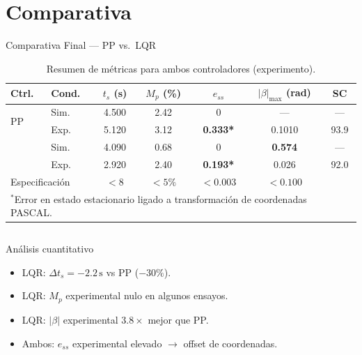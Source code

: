 \documentclass[mathserif,spanish,10pt]{beamer}
\newcommand{\good}[1]{\textcolor{passgreen}{#1}}
\newcommand{\warn}[1]{\textbf{\color{kpiorange}#1}}
\begin{document}
\section{Comparativa}

\begin{frame}{Comparativa Final --- PP vs.\ LQR}

\begin{table}
    \centering
    \caption{Resumen de métricas para ambos controladores (experimento).}
    \small
    \begin{tabular}{llccccc}
      \hline
      \rowcolor{rowhdr}
      \color{white}\textbf{Ctrl.} &
      \color{white}\textbf{Cond.} &
      \color{white}$t_s$ (s) &
      \color{white}$M_p$ (\%) &
      \color{white}$e_{ss}$ &
      \color{white}$|\beta|_{\max}$ (rad) &
      \color{white}SC \\
      \hline
      \multirow{2}{*}{PP} & Sim. & 4.500 & 2.42 & 0 & --- & --- \\
                          & Exp. & 5.120 & 3.12 & \warn{0.333*} & 0.1010 & 93.9 \\
      \hline
      \rowcolor{rowsim}
                          & Sim. & 4.090 & 0.68 & 0 & \warn{0.574} & --- \\
      \rowcolor{rowsim}
      \multirow{-2}{*}{LQR} & Exp. & \good{2.920} & \good{2.40} & \warn{0.193*} & \good{0.026} & \good{92.0} \\
      \hline
      \multicolumn{2}{l}{\scriptsize Especificación} &
      \scriptsize$<8$ & \scriptsize$<5\%$ &
      \scriptsize$<0.003$ &
      \scriptsize$<0.100$ & \\
      \hline
      \multicolumn{7}{l}{\scriptsize $^*$Error en estado estacionario ligado a transformación de coordenadas PASCAL.}
    \end{tabular}
  \end{table}

  \vspace{2pt}
  \begin{columns}[T]
    \begin{block}{\small Análisis cuantitativo}
      \scriptsize
      \begin{itemize}
        \item LQR: $\Delta t_s = -2.2\,\text{s}$ vs PP ($-30\%$).
        \item LQR: $M_p$ experimental nulo en algunos ensayos.
        \item LQR: $|\beta|$ experimental $3.8\times$ mejor que PP.
        \item Ambos: $e_{ss}$ experimental elevado $\to$ offset de coordenadas.
      \end{itemize}
    \end{block}


\end{columns}
\end{frame}
\end{document}
